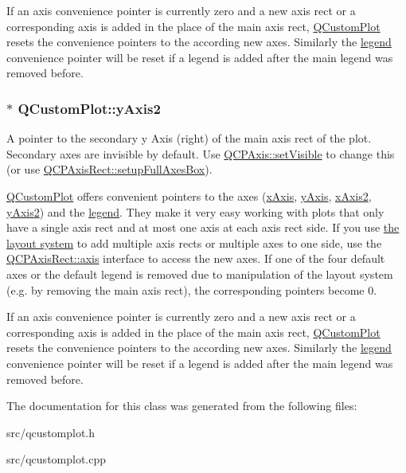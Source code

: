 If an axis convenience pointer is currently zero and a new axis rect or a corresponding axis is added in the place of the main axis rect, \hyperlink{classQCustomPlot}{Q\+Custom\+Plot} resets the convenience pointers to the according new axes. Similarly the \hyperlink{classQCustomPlot_a4eadcd237dc6a09938b68b16877fa6af}{legend} convenience pointer will be reset if a legend is added after the main legend was removed before. 
\subsubsection[{\texorpdfstring{y\+Axis2}{yAxis2}}]{ $\ast$ Q\+Custom\+Plot\+::y\+Axis2}\hypertarget{classQCustomPlot_af13fdc5bce7d0fabd640f13ba805c0b7}{}\label{classQCustomPlot_af13fdc5bce7d0fabd640f13ba805c0b7}
A pointer to the secondary y Axis (right) of the main axis rect of the plot. Secondary axes are invisible by default. Use \hyperlink{classQCPLayerable_a3bed99ddc396b48ce3ebfdc0418744f8}{Q\+C\+P\+Axis\+::set\+Visible} to change this (or use \hyperlink{classQCPAxisRect_a5fa906175447b14206954f77fc7f1ef4}{Q\+C\+P\+Axis\+Rect\+::setup\+Full\+Axes\+Box}).

\hyperlink{classQCustomPlot}{Q\+Custom\+Plot} offers convenient pointers to the axes (\hyperlink{classQCustomPlot_a9a79cd0158a4c7f30cbc702f0fd800e4}{x\+Axis}, \hyperlink{classQCustomPlot_af6fea5679725b152c14facd920b19367}{y\+Axis}, \hyperlink{classQCustomPlot_ada41599f22cad901c030f3dcbdd82fd9}{x\+Axis2}, \hyperlink{classQCustomPlot_af13fdc5bce7d0fabd640f13ba805c0b7}{y\+Axis2}) and the \hyperlink{classQCustomPlot_a4eadcd237dc6a09938b68b16877fa6af}{legend}. They make it very easy working with plots that only have a single axis rect and at most one axis at each axis rect side. If you use \hyperlink{}{the layout system} to add multiple axis rects or multiple axes to one side, use the \hyperlink{classQCPAxisRect_a560de44e47a4af0f86c59102a094b1e4}{Q\+C\+P\+Axis\+Rect\+::axis} interface to access the new axes. If one of the four default axes or the default legend is removed due to manipulation of the layout system (e.\+g. by removing the main axis rect), the corresponding pointers become 0.

If an axis convenience pointer is currently zero and a new axis rect or a corresponding axis is added in the place of the main axis rect, \hyperlink{classQCustomPlot}{Q\+Custom\+Plot} resets the convenience pointers to the according new axes. Similarly the \hyperlink{classQCustomPlot_a4eadcd237dc6a09938b68b16877fa6af}{legend} convenience pointer will be reset if a legend is added after the main legend was removed before. 

The documentation for this class was generated from the following files\+:\begin{DoxyCompactItemize}
\item 
src/qcustomplot.\+h\item 
src/qcustomplot.\+cpp\end{DoxyCompactItemize}
